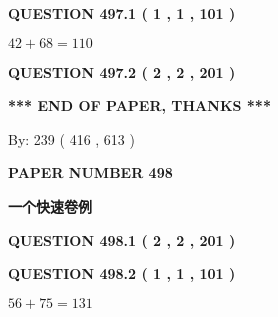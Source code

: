 \documentclass{ctexart}
\begin{document}
   
  
\vspace{0.2in}
  
{\textbf{\Large{QUESTION
497.1 
 ( 1 , 1 , 101 )
}}}
  
  
 
 

$ %
42 +  %
68=   %
110$
 
 
  
\vspace{0.2in}
  
{\textbf{\Large{QUESTION
497.2 
 ( 2 , 2 , 201 )
}}}
  
  
   
   
 \vspace{0.2in}
 
   
   
   
   
\vspace{1.0in} 
{\textbf{\large{ *** END OF PAPER, THANKS *** }}} 
   
   
\hspace{1.0in} By: 
 239 ( 416 ,  613 )
   
   
   
   
\newpage 
\setcounter{page}{ 
   498001 } 
   
   
   
   
 {\textbf{ \Large{ PAPER NUMBER  498  }}}
   
   
\vspace{0.2in}
   
   
   
   
   
   
 \vspace{0.2in}
{\LARGE {\textbf{ 一个快速卷例}}}
   
   
  
\vspace{0.2in}
  
{\textbf{\Large{QUESTION
498.1 
 ( 2 , 2 , 201 )
}}}
  
  
  
\vspace{0.2in}
  
{\textbf{\Large{QUESTION
498.2 
 ( 1 , 1 , 101 )
}}}
  
  
 
 

$ %
56 +  %
75=   %
131$
 
 
   
\end{document}
